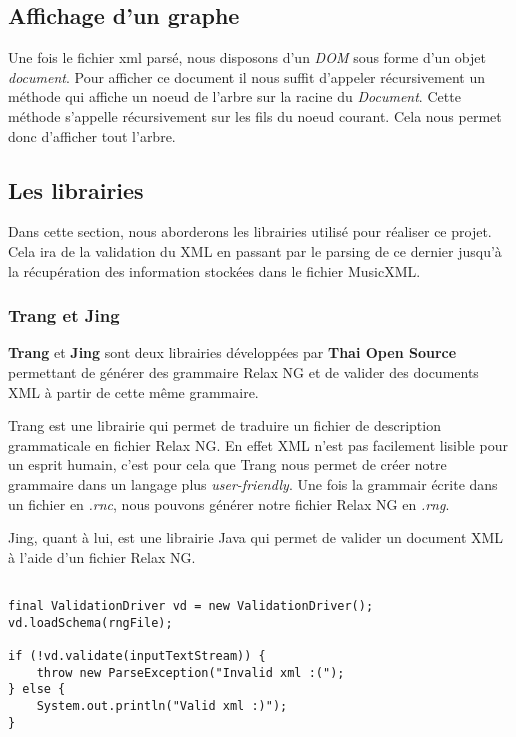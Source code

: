 \subsection{Affichage d'un graphe}
Une fois le fichier xml parsé, nous disposons d'un \emph{DOM} sous forme d'un objet
\emph{document}. Pour afficher ce document il nous suffit d'appeler récursivement
un méthode qui affiche un noeud de l'arbre sur la racine du \emph{Document}. Cette
méthode s'appelle récursivement sur les fils du noeud courant. Cela nous permet
donc d'afficher tout l'arbre.



\subsection{Les librairies}

Dans cette section, nous aborderons les librairies utilisé pour réaliser ce projet. Cela ira de la validation du XML en passant par le parsing de ce dernier jusqu'à la récupération des information stockées dans le fichier MusicXML.


\subsubsection{Trang et Jing}
\textbf{Trang} et \textbf{Jing} sont deux librairies développées par \textbf{Thai Open Source} permettant de générer des grammaire Relax NG et de valider des documents XML à partir de cette même grammaire.

Trang est une librairie qui permet de traduire un fichier de description grammaticale en fichier Relax NG. En effet XML n'est pas facilement lisible pour un esprit humain, c'est pour cela que Trang nous permet de créer notre grammaire dans un langage plus \emph{user-friendly}. Une fois la grammair écrite dans un fichier en \emph{.rnc}, nous pouvons générer notre fichier Relax NG en \emph{.rng}.

Jing, quant à lui, est une librairie Java qui permet de valider un document XML à l'aide d'un fichier Relax NG.

\begin{lstlisting}[caption=Code java permettant de vérifier la validation d'un document XML]

final ValidationDriver vd = new ValidationDriver();
vd.loadSchema(rngFile);

if (!vd.validate(inputTextStream)) {
	throw new ParseException("Invalid xml :(");
} else {
    System.out.println("Valid xml :)");
}
\end{lstlisting}

